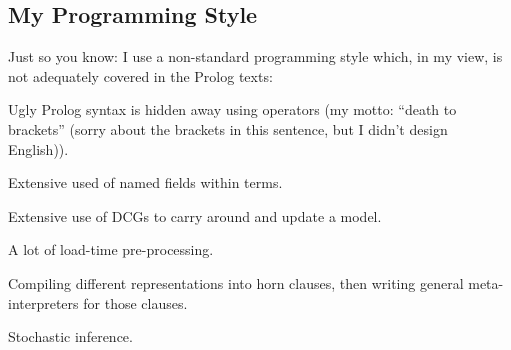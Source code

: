 \subsection{My Programming Style}

Just so you know: I use a non-standard programming style which, in
my view, is not adequately covered in the Prolog texts:

\bi \item



Ugly Prolog syntax is hidden away using operators (my motto:
``death to brackets'' (sorry about the brackets in this sentence,
but I didn't design English)).

\item

Extensive used of named fields within terms.

\item

Extensive use of DCGs to carry around and update a model.

\item

A lot of load-time pre-processing.

\item

Compiling different representations into horn clauses, then
writing general meta-interpreters for those clauses.

\item

Stochastic inference.


\ei
